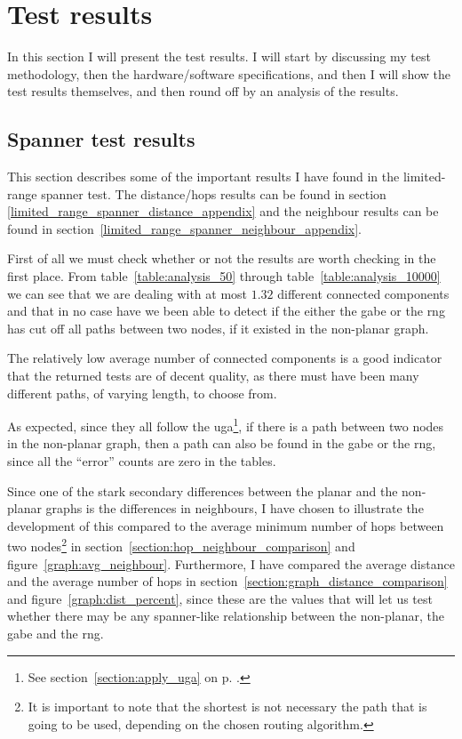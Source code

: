 \section{Test results}
\label{section:test_results}
In this section I will present the test results. I will start by discussing my test methodology, then the hardware/software specifications, and then I will show the test results themselves, and then round off by an analysis of the results.

\subsection{Spanner test results}
This section describes some of the important results I have found in the limited-range spanner test. The distance/hops results can be found in section \ref{limited_range_spanner_distance_appendix} and the neighbour results can be found in section~\ref{limited_range_spanner_neighbour_appendix}.

First of all we must check whether or not the results are worth checking in the first place. From table~\ref{table:analysis_50} through table~\ref{table:analysis_10000} we can see that we are dealing with at most $1.32$ different connected components and that in no case have we been able to detect if the either the \ac{gabe} or the \ac{rng} has cut off all paths between two nodes, if it existed in the non-planar graph. 

The relatively low average number of connected components is a good indicator that the returned tests are of decent quality, as there must have been many different paths, of varying length, to choose from.

As expected, since they all follow the \ac{uga}\footnote{See section~\ref{section:apply_uga} on p. \pageref{section:apply_uga}.}, if there is a path between two nodes in the non-planar graph, then a path can also be found in the \ac{gabe} or the \ac{rng}, since all the ``error'' counts are zero in the tables.

Since one of the stark secondary differences between the planar and the non-planar graphs is the differences in neighbours, I have chosen to illustrate the development of this compared to the average minimum number of hops between two nodes\footnote{It is important to note that the shortest is not necessary the path that is going to be used, depending on the chosen routing algorithm.} in section~\ref{section:hop_neighbour_comparison} and figure~\ref{graph:avg_neighbour}. Furthermore, I have compared the average distance and the average number of hops in section~\ref{section:graph_distance_comparison} and figure~\ref{graph:dist_percent}, since these are the values that will let us test whether there may be any spanner-like relationship between the non-planar, the \ac{gabe} and the \ac{rng}.

